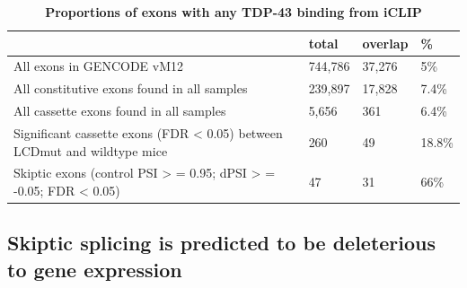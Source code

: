\begin{table}
	\begin{footnotesize}
	\begin{tabular}{llll}
		& total & overlap	& \% \\
		\hline
		All exons in GENCODE vM12 &	744,786	& 37,276 & 5\% \\
		All constitutive exons found in all samples	& 239,897	& 17,828	& 7.4\% \\
		All cassette exons found in all samples &	5,656 &	361	& 6.4\% \\
		Significant cassette exons (FDR < 0.05) between LCDmut and wildtype mice	& 260	& 49 & 18.8\% \\
		Skiptic exons (control PSI > = 0.95; dPSI > = -0.05; FDR < 0.05) & 47 &	31 & 66\% \\
	\end{tabular}
	\end{footnotesize}
	\caption[Proportions of exons with any TDP-43 binding from iCLIP]{\textbf{Proportions of exons with any TDP-43 binding from iCLIP}}
	\label{tab:iclip_proportions}
\end{table}


\subsection{Skiptic splicing is predicted to be deleterious to gene expression}

